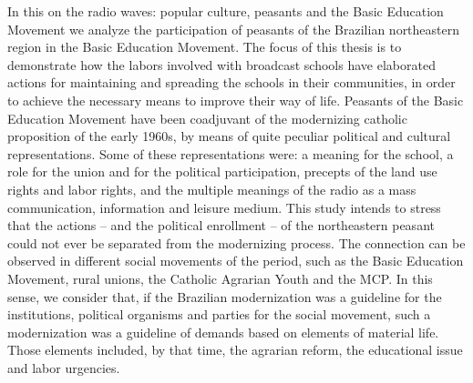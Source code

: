 In this on the radio waves: popular culture, peasants and the Basic Education Movement we analyze the participation of peasants of the Brazilian northeastern region in the Basic Education Movement. The focus of this thesis is to demonstrate how the labors involved with broadcast schools have elaborated actions for maintaining and spreading the schools in their communities, in order to achieve the necessary means to improve their way of life. Peasants of the Basic Education Movement have been coadjuvant of the modernizing catholic proposition of the early 1960s, by means of quite peculiar political and cultural representations. Some of these representations were: a meaning for the school, a role for the union and for the political participation, precepts of the land use rights and labor rights, and the multiple meanings of the radio as a mass communication, information and leisure medium. This study intends to stress that the actions – and the political enrollment – of the northeastern peasant could not ever be separated from the modernizing process. The connection can be observed in different social movements of the period, such as the Basic Education Movement, rural unions, the Catholic Agrarian Youth and the MCP. In this sense, we consider that, if the Brazilian modernization was a guideline for the institutions, political organisms and parties for the social movement, such a modernization was a guideline of demands based on elements of material life. Those elements included, by that time, the agrarian reform, the educational issue and labor urgencies.

